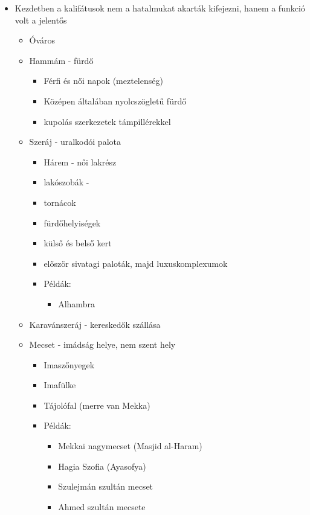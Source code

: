 \documentclass{article}
\begin{document}
\begin{itemize}

    \item Kezdetben a kalifátusok nem a hatalmukat akarták kifejezni, hanem a funkció volt a jelentős
    \begin{itemize}
        \item Óváros 
        \item Hammám - fürdő
        \begin{itemize}
            \item Férfi és női napok (meztelenség)
            \item Középen általában nyolcszögletű fürdő
            \item kupolás szerkezetek támpillérekkel
        \end{itemize}
        \item Szeráj -  uralkodói palota \begin{itemize}
            \item Hárem - női lakrész
            \item lakószobák - 
            \item tornácok
            \item fürdőhelyiségek
            \item külső és belső kert
            \item először sivatagi paloták, majd luxuskomplexumok
            \item Példák: \begin{itemize}
                \item Alhambra
            \end{itemize}
        \end{itemize}
        \item Karavánszeráj - kereskedők szállása
        
        \item Mecset - imádság helye, nem szent hely
        \begin{itemize}
            \item Imaszőnyegek
            \item Imafülke
            \item Tájolófal (merre van Mekka)
            
            \item Példák:
            \begin{itemize}
                \item Mekkai nagymecset (Masjid al-Haram)
                \item Hagia Szofia (Ayasofya)
                \item Szulejmán szultán mecset
                \item Ahmed szultán mecsete
            \end{itemize}
        \end{itemize}
        

\end{itemize}
\end{itemize}
\end{document}
